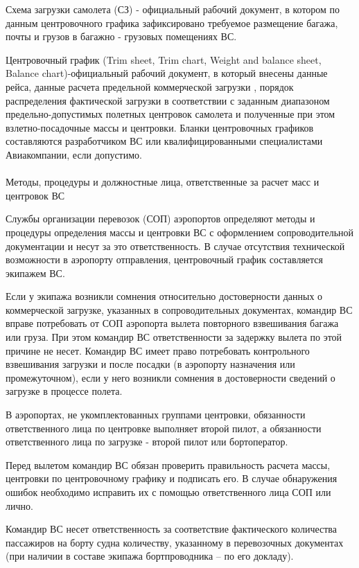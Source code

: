 Схема загрузки самолета (СЗ) - официальный рабочий документ, в котором по данным центровочного графика зафиксировано требуемое размещение багажа, почты и грузов в багажно - грузовых помещениях ВС.

Центровочный график (Trim sheet, Trim chart, Weight and balance sheet, Balance chart)-официальный рабочий документ, в который внесены данные рейса, данные расчета предельной коммерческой загрузки , порядок распределения фактической загрузки в соответствии с заданным диапазоном предельно-допустимых полетных центровок самолета и полученные при этом взлетно-посадочные массы и центровки.
Бланки центровочных графиков составляются разработчиком ВС или квалифицированными специалистами Авиакомпании, если допустимо.

\paragraph{} Методы, процедуры и должностные лица, ответственные за расчет масс и центровок ВС

Службы организации перевозок (СОП) аэропортов определяют методы и процедуры определения массы и центровки ВС с оформлением сопроводительной документации и несут за это ответственность. В случае отсутствия технической возможности в аэропорту отправления, центровочный график составляется экипажем ВС.

Если у экипажа возникли сомнения относительно достоверности данных о коммерческой загрузке, указанных в сопроводительных документах, командир ВС вправе потребовать от СОП аэропорта вылета повторного взвешивания багажа или груза. При этом командир ВС ответственности за задержку вылета по этой причине не несет. Командир ВС имеет право потребовать контрольного взвешивания загрузки и после посадки (в аэропорту назначения или промежуточном), если у него возникли сомнения в достоверности сведений о загрузке в процессе полета.

В аэропортах, не укомплектованных группами центровки, обязанности ответственного лица по центровке выполняет второй пилот, а обязанности ответственного лица по загрузке - второй пилот или бортоператор.

Перед вылетом командир ВС обязан проверить правильность расчета массы, центровки по центровочному графику и подписать его. В случае обнаружения ошибок необходимо исправить их с помощью ответственного лица СОП или лично.

Командир ВС несет ответственность за соответствие фактического количества пассажиров на борту судна количеству, указанному в перевозочных документах (при наличии в составе экипажа бортпроводника – по его докладу).

